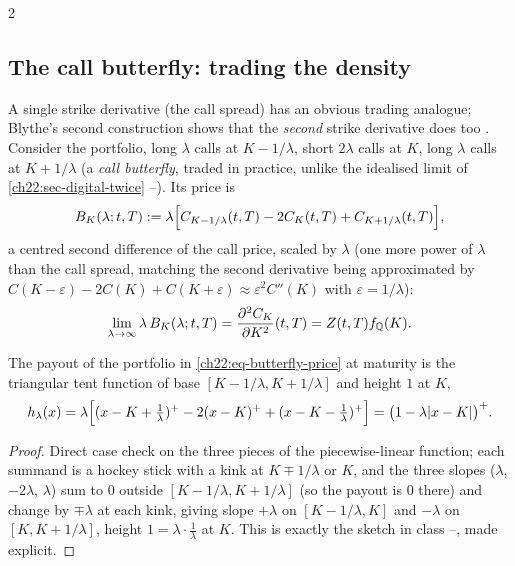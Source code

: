 \begin{paracol}{2}
\subsection{The call butterfly: trading the density}\label{ch22:sec-butterfly}
A single strike derivative (the call spread) has an obvious trading analogue; Blythe's second
construction shows that the \emph{second} strike derivative does too . Consider the
portfolio, long $\lambda$ calls at $K-1/\lambda$, short $2\lambda$ calls at $K$, long $\lambda$ calls at
$K+1/\lambda$ (a \emph{call butterfly}, traded in practice, unlike the idealised limit of
\cref{ch22:sec-digital-twice} --). Its price is
\begin{equation}\label{ch22:eq-butterfly-price}
  B_K(\lambda;t,T) := \lambda\Bigl[C_{K-1/\lambda}(t,T) - 2C_K(t,T) + C_{K+1/\lambda}(t,T)\Bigr],
\end{equation}
a centred second difference of the call price, scaled by $\lambda$ (one more power of $\lambda$ than
the call spread, matching the second derivative being approximated by
$C(K-\varepsilon)-2C(K)+C(K+\varepsilon)\approx\varepsilon^2C''(K)$ with $\varepsilon=1/\lambda$):
\begin{equation}\label{ch22:eq-butterfly-limit}
  \lim_{\lambda\to\infty}\lambda\,B_K(\lambda;t,T) = \frac{\partial^2 C_K}{\partial K^2}(t,T) = Z(t,T)f_{\mathbb{Q}}(K).
\end{equation}

\begin{proposition}\label{ch22:prop-triangle}
The payout of the portfolio in \eqref{ch22:eq-butterfly-price} at maturity is the triangular tent
function of base $[K-1/\lambda,K+1/\lambda]$ and height $1$ at $K$,
\[
  h_\lambda(x) = \lambda\Bigl[(x-K+\tfrac1\lambda)^+ - 2(x-K)^+ + (x-K-\tfrac1\lambda)^+\Bigr]
  = \bigl(1-\lambda|x-K|\bigr)^+ .
\]
\end{proposition}
\begin{proof}
Direct case check on the three pieces of the piecewise-linear function; each summand is a hockey stick
with a kink at $K\mp1/\lambda$ or $K$, and the three slopes ($\lambda$, $-2\lambda$, $\lambda$) sum to
$0$ outside $[K-1/\lambda,K+1/\lambda]$ (so the payout is $0$ there) and change by $\mp\lambda$ at each
kink, giving slope $+\lambda$ on $[K-1/\lambda,K]$ and $-\lambda$ on $[K,K+1/\lambda]$, height
$1=\lambda\cdot\frac1\lambda$ at $K$. This is exactly the sketch in class
--, made explicit.
\end{proof}


\end{paracol}
